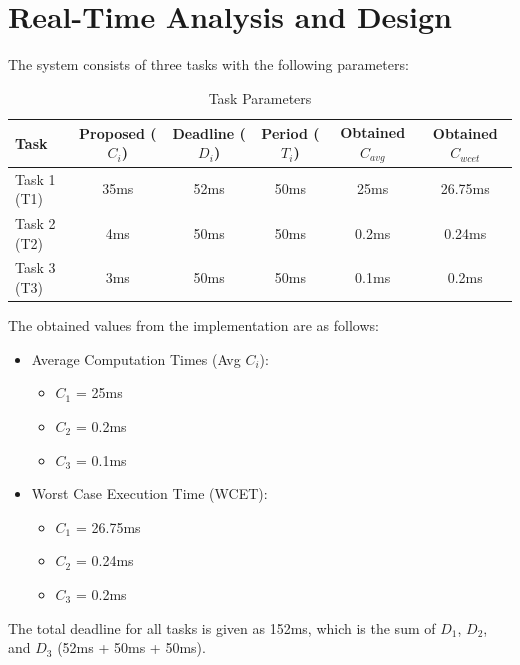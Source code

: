 \documentclass[a4paper,11pt]{article}%
\begin{document}
\section{Real-Time Analysis and Design}
The system consists of three tasks with the following parameters:

\begin{table}[H]
    \centering
    \begin{tabular}{|l|c|c|c|c|c|}
    \hline
    Task & Proposed ($C_i$) & Deadline ($D_i$) & Period ($T_i$) & Obtained $C_{avg}$ & Obtained $C_{wcet}$  \\
    \hline
    Task 1 (T1) & 35ms & 52ms & 50ms & 25ms & 26.75ms\\
    Task 2 (T2) & 4ms & 50ms & 50ms & 0.2ms & 0.24ms\\
    Task 3 (T3) & 3ms & 50ms & 50ms & 0.1ms & 0.2ms\\
    \hline
    \end{tabular}
\caption{Task Parameters}
\label{tab:task_params}
\end{table}



The obtained values from the implementation are as follows:
\begin{itemize}
\item Average Computation Times (Avg $C_i$):
\begin{itemize}
\item $C_1$ = 25ms
\item $C_2$ = 0.2ms
\item $C_3$ = 0.1ms
\end{itemize}
\item Worst Case Execution Time (WCET):
\begin{itemize}
\item $C_1$ = 26.75ms
\item $C_2$ = 0.24ms
\item $C_3$ = 0.2ms
\end{itemize}
\end{itemize}
The total deadline for all tasks is given as 152ms, which is the sum of $D_1$, $D_2$, and $D_3$ (52ms + 50ms + 50ms).
\end{document}
